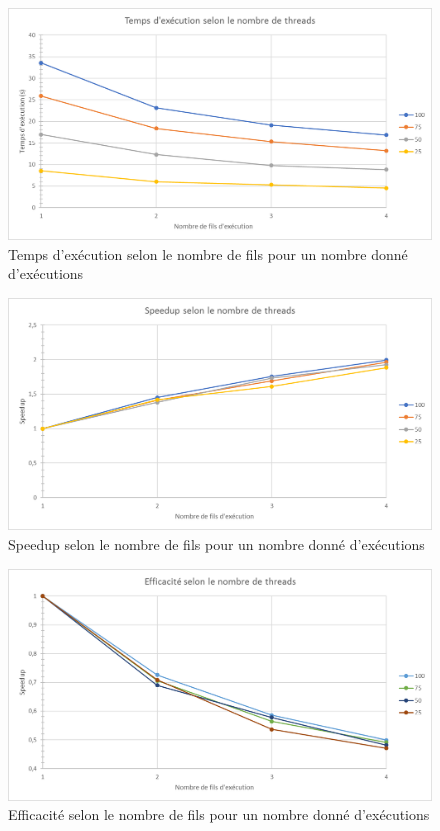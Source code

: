 \documentclass{report}
\begin{document}
\begin{center}
	\begin{figure}[H]
		\includegraphics[scale=0.6]{Images/graph_temps.png}
		\caption{Temps d'exécution selon le nombre de fils pour un nombre donné d'exécutions}
	\end{figure}

	\begin{figure}[H]
		\includegraphics[scale=0.6]{Images/graph_speedup.png}
		\caption{Speedup selon le nombre de fils pour un nombre donné d'exécutions}
	\end{figure}

	\begin{figure}[H]
		\includegraphics[scale=0.6]{Images/graph_eff.png}
		\caption{Efficacité selon le nombre de fils pour un nombre donné d'exécutions}
	\end{figure}
\end{center}
\end{document}
